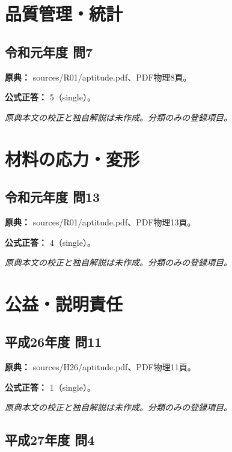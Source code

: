 \section{品質管理・統計}

\subsection{令和元年度 問7}
\label{q:r01-reg-apt-07}

\noindent\textbf{原典：} sources/R01/aptitude.pdf、PDF物理8頁。

\textbf{公式正答：} 5（single）。

\par\textit{原典本文の校正と独自解説は未作成。分類のみの登録項目。}

\section{材料の応力・変形}

\subsection{令和元年度 問13}
\label{q:r01-reg-apt-13}

\noindent\textbf{原典：} sources/R01/aptitude.pdf、PDF物理13頁。

\textbf{公式正答：} 4（single）。

\par\textit{原典本文の校正と独自解説は未作成。分類のみの登録項目。}

\section{公益・説明責任}

\subsection{平成26年度 問11}
\label{q:h26-reg-apt-11}

\noindent\textbf{原典：} sources/H26/aptitude.pdf、PDF物理11頁。

\textbf{公式正答：} 1（single）。

\par\textit{原典本文の校正と独自解説は未作成。分類のみの登録項目。}

\subsection{平成27年度 問4}
\label{q:h27-reg-apt-04}

